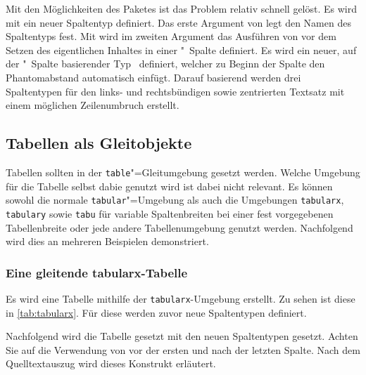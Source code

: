 \documentclass[%
  english,ngerman,%
  geometry=no,DIV=12,automark,%
]{tudscrartcl}
\begin{document}
Mit den Möglichkeiten des Paketes  ist das Problem relativ 
schnell gelöst. Es wird mit  ein neuer Spaltentyp 
definiert. Das erste Argument von  legt den Namen des 
Spaltentyps fest. Mit  wird im 
zweiten Argument das Ausführen von  vor dem Setzen des 
eigentlichen Inhaltes in einer "~Spalte definiert. Es wird ein 
neuer, auf der "~Spalte basierender Typ~ definiert, welcher 
zu Beginn der Spalte den Phantomabstand automatisch einfügt. Darauf basierend 
werden drei Spaltentypen für den links- und rechtsbündigen sowie zentrierten 
Textsatz mit einem möglichen Zeilenumbruch erstellt.
%
\begin{Trunk+}
\subsection{Tabellen als Gleitobjekte}
Tabellen sollten in der \texttt{table}"=Gleitumgebung gesetzt werden. 
Welche Umgebung für die Tabelle selbst dabie genutzt wird ist dabei
nicht relevant. Es können sowohl die normale \texttt{tabular}"=Umgebung 
als auch die Umgebungen \texttt{tabularx}, \texttt{tabulary} sowie 
\texttt{tabu} für variable Spaltenbreiten bei einer fest vorgegebenen 
Tabellenbreite oder jede andere Tabellenumgebung genutzt werden. 
Nachfolgend wird dies an mehreren Beispielen demonstriert.

\subsubsection{Eine gleitende tabularx-Tabelle}
Es wird eine Tabelle mithilfe der \texttt{tabularx}-Umgebung erstellt. 
Zu sehen ist diese in \autoref{tab:tabularx}. Für diese werden zuvor 
neue Spaltentypen definiert.

\end{Trunk+}
\CodeHook{\renewcommand*{\newcolumntype}[2]{}}
\begin{Trunk*}

\end{Trunk*}
%
Nachfolgend wird die Tabelle gesetzt mit den neuen Spaltentypen gesetzt. Achten 
Sie auf die Verwendung von  vor der ersten und nach der letzten 
Spalte. Nach dem Quelltextauszug wird dieses Konstrukt erläutert.
\end{document}
